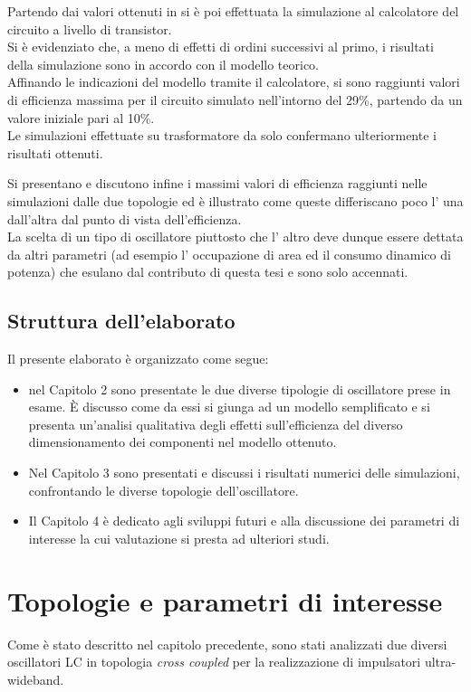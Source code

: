\documentclass[a4paper, 12pt]{memoir}
\begin{document}
Partendo dai valori ottenuti in\cite{Neviani14} si è poi effettuata la
simulazione al calcolatore del circuito a livello di transistor.\\
Si è evidenziato che, a meno di effetti di ordini successivi al primo, i
risultati della simulazione sono in accordo con il modello teorico.\\
Affinando le indicazioni del modello tramite il calcolatore, si sono
raggiunti valori di efficienza massima per il circuito simulato nell'intorno
del 29\%, partendo da un valore iniziale pari al 10\%.\\
Le simulazioni effettuate su trasformatore da solo confermano ulteriormente i
risultati ottenuti.

Si presentano e discutono infine i massimi valori di efficienza raggiunti nelle
simulazioni dalle due topologie ed è illustrato come queste differiscano poco l'
una dall'altra dal punto di vista dell'efficienza. \\
La scelta di un tipo di oscillatore piuttosto che l' altro deve dunque essere
dettata da altri parametri (ad esempio l' occupazione di area ed il consumo
dinamico di potenza) che esulano dal contributo di questa tesi e sono solo
accennati.
\newpage
\section{Struttura dell'elaborato}
Il presente elaborato è organizzato come segue:
\begin{itemize}
\item nel Capitolo 2 sono presentate le due diverse tipologie di oscillatore
	prese in esame. \`E discusso come da essi si giunga ad un modello
	semplificato e si presenta un'analisi qualitativa degli effetti
	sull'efficienza del diverso dimensionamento dei componenti nel
	modello ottenuto.
\item Nel Capitolo 3 sono presentati e discussi i risultati numerici delle
	simulazioni, confrontando le diverse topologie dell'oscillatore.
\item Il Capitolo 4 è dedicato agli sviluppi futuri e alla discussione dei
	parametri di interesse la cui valutazione si presta ad ulteriori studi.
\end{itemize}
\chapter{Topologie e parametri di interesse}
Come è stato descritto nel capitolo precedente, sono stati analizzati due
diversi oscillatori LC in topologia \emph{cross coupled} per la realizzazione di
impulsatori ultra-wideband.
\end{document}
